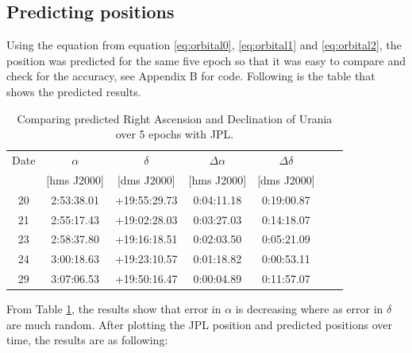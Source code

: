 \documentclass[a4paper,12pt]{article}
\begin{document}
\subsection{Predicting positions}
\label{sec:predict}
Using the equation from equation \ref{eq:orbital0}, \ref{eq:orbital1} and \ref{eq:orbital2}, the position was predicted for the same five epoch so that it was easy to compare and check for the accuracy, see Appendix B for code. Following is the table that shows the predicted results. 
\begin{table}[H]
\centering %
\caption{Comparing predicted Right Ascension and Declination of Urania over 5 epochs with JPL.}
\footnotesize
\begin{tabular}{ccccccc}%
\hline
\hline
Date  & $\alpha$ & $\delta$ & $\Delta \alpha$ & $\Delta \delta$ \\
& [hms J2000]&[dms J2000] &[hms J2000]&[dms J2000]\\
\hline
\hline
20 &2:53:38.01& +19:55:29.73&0:04:11.18 &0:19:00.87\\
21 &2:55:17.43& +19:02:28.03&0:03:27.03 &0:14:18.07\\
23 &2:58:37.80& +19:16:18.51&0:02:03.50 &0:05:21.09\\
24 &3:00:18.63& +19:23:10.57&0:01:18.82 &0:00:53.11\\
29 &3:07:06.53& +19:50:16.47&0:00:04.89  &0:11:57.07\\


\hline
\hline
\end{tabular}
\label{table:prediction} %
\end{table}
From Table \ref{table:prediction}, the results show that error in $\alpha$ is decreasing where as error in $\delta$ are much random. After plotting the JPL position and predicted positions over time, the results are as following:
\end{document}

